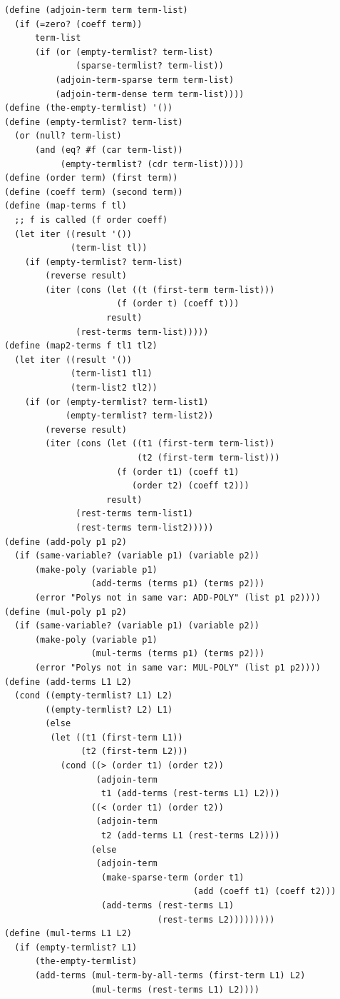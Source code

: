 \documentclass[final,fleqn,titlepage,twoside]{article}
\begin{document}
\begin{verbatim}
(define (adjoin-term term term-list)
  (if (=zero? (coeff term))
      term-list
      (if (or (empty-termlist? term-list)
              (sparse-termlist? term-list))
          (adjoin-term-sparse term term-list)
          (adjoin-term-dense term term-list))))
(define (the-empty-termlist) '())
(define (empty-termlist? term-list)
  (or (null? term-list)
      (and (eq? #f (car term-list))
           (empty-termlist? (cdr term-list)))))
(define (order term) (first term))
(define (coeff term) (second term))
(define (map-terms f tl)
  ;; f is called (f order coeff)
  (let iter ((result '())
             (term-list tl))
    (if (empty-termlist? term-list)
        (reverse result)
        (iter (cons (let ((t (first-term term-list)))
                      (f (order t) (coeff t)))
                    result)
              (rest-terms term-list)))))
(define (map2-terms f tl1 tl2)
  (let iter ((result '())
             (term-list1 tl1)
             (term-list2 tl2))
    (if (or (empty-termlist? term-list1)
            (empty-termlist? term-list2))
        (reverse result)
        (iter (cons (let ((t1 (first-term term-list))
                          (t2 (first-term term-list)))
                      (f (order t1) (coeff t1)
                         (order t2) (coeff t2)))
                    result)
              (rest-terms term-list1)
              (rest-terms term-list2)))))
(define (add-poly p1 p2)
  (if (same-variable? (variable p1) (variable p2))
      (make-poly (variable p1)
                 (add-terms (terms p1) (terms p2)))
      (error "Polys not in same var: ADD-POLY" (list p1 p2))))
(define (mul-poly p1 p2)
  (if (same-variable? (variable p1) (variable p2))
      (make-poly (variable p1)
                 (mul-terms (terms p1) (terms p2)))
      (error "Polys not in same var: MUL-POLY" (list p1 p2))))
(define (add-terms L1 L2)
  (cond ((empty-termlist? L1) L2)
        ((empty-termlist? L2) L1)
        (else
         (let ((t1 (first-term L1))
               (t2 (first-term L2)))
           (cond ((> (order t1) (order t2))
                  (adjoin-term
                   t1 (add-terms (rest-terms L1) L2)))
                 ((< (order t1) (order t2))
                  (adjoin-term
                   t2 (add-terms L1 (rest-terms L2))))
                 (else
                  (adjoin-term
                   (make-sparse-term (order t1)
                                     (add (coeff t1) (coeff t2)))
                   (add-terms (rest-terms L1)
                              (rest-terms L2)))))))))
(define (mul-terms L1 L2)
  (if (empty-termlist? L1)
      (the-empty-termlist)
      (add-terms (mul-term-by-all-terms (first-term L1) L2)
                 (mul-terms (rest-terms L1) L2))))


\end{verbatim}
\end{document}
